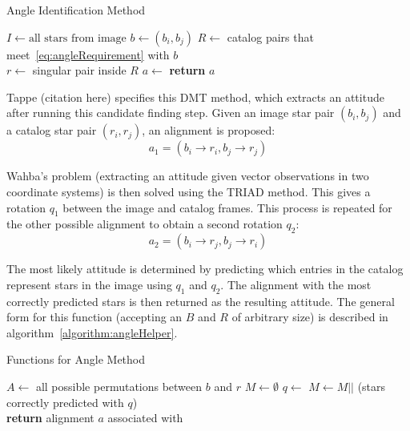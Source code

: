 \begin{algorithm}
    \caption{Angle Identification Method} \label{algorithm:angleIdentification}
    \begin{algorithmic}[1]
        \State $I \gets \text{all stars} \text{ from image}$
        \State $b \gets (b_i, b_j)$
        \State $R \gets $ catalog pairs that meet~\eqref{eq:angleRequirement} with $b$
        \\
        \State $r \gets $ singular pair inside $R$
        \State $a \gets $ 
        \State \textbf{return} $a$
        \EndIf
        \EndFor
        \EndFor
        \EndProcedure
    \end{algorithmic}
\end{algorithm}

Tappe (citation here) specifies this DMT method, which extracts an attitude after running this candidate finding step.
Given an image star pair $(b_i, b_j)$ and a catalog star pair $(r_i, r_j)$, an alignment is proposed:
\begin{equation}
    a_1 = (b_i \rightarrow r_i, b_j \rightarrow r_j)
\end{equation}

Wahba's problem (extracting an attitude given vector observations in two coordinate systems) is then solved using the
TRIAD method.
This gives a rotation $q_1$ between the image and catalog frames.
This process is repeated for the other possible alignment to obtain a second rotation $q_2$:
\begin{equation}
    a_2 = (b_i \rightarrow r_j, b_j \rightarrow r_i)
\end{equation}

The most likely attitude is determined by predicting which entries in the catalog represent stars in the image using
$q_1$ and $q_2$.
The alignment with the most correctly predicted stars is then returned as the resulting attitude.
The general form for this function (accepting an $B$ and $R$ of arbitrary size) is described in
algorithm~\ref{algorithm:angleHelper}.

\begin{algorithm}
    \caption{Functions for Angle Method} \label{algorithm:angleHelper}
    \begin{algorithmic}[1]
        \State $A \gets $ all possible permutations between $b$ and $r$
        \State $M \gets \emptyset$
        \State $q \gets $ 
        \State $M \gets M ||$ (stars correctly predicted with $q$)
        \EndFor
        \\
        \State \textbf{return} alignment $a$ associated with 
        \EndFunction
    \end{algorithmic}
\end{algorithm}

